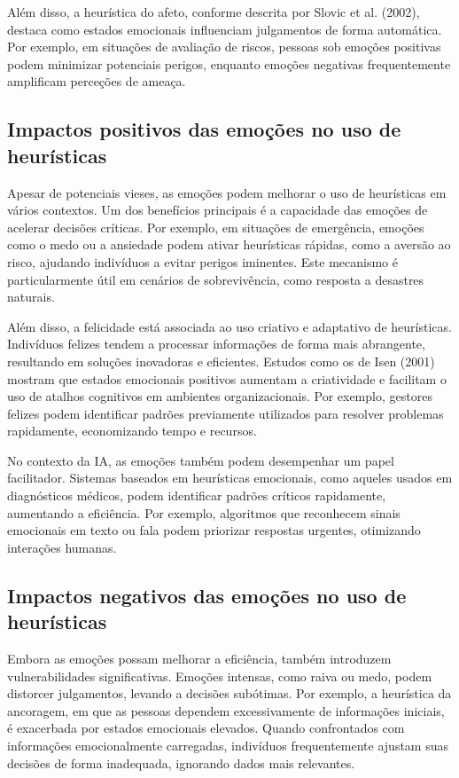 \documentclass[a4paper,12pt]{report}
\begin{document}
	Além disso, a heurística do afeto, conforme descrita por Slovic et al. (2002), destaca como estados emocionais influenciam julgamentos de forma automática. Por exemplo, em situações de avaliação de riscos, pessoas sob emoções positivas podem minimizar potenciais perigos, enquanto emoções negativas frequentemente amplificam perceções de ameaça.
	
	\subsection{Impactos positivos das emoções no uso de heurísticas}
	
	Apesar de potenciais vieses, as emoções podem melhorar o uso de heurísticas em vários contextos. Um dos benefícios principais é a capacidade das emoções de acelerar decisões críticas. Por exemplo, em situações de emergência, emoções como o medo ou a ansiedade podem ativar heurísticas rápidas, como a aversão ao risco, ajudando indivíduos a evitar perigos iminentes. Este mecanismo é particularmente útil em cenários de sobrevivência, como resposta a desastres naturais.
	
	Além disso, a felicidade está associada ao uso criativo e adaptativo de heurísticas. Indivíduos felizes tendem a processar informações de forma mais abrangente, resultando em soluções inovadoras e eficientes. Estudos como os de Isen (2001) mostram que estados emocionais positivos aumentam a criatividade e facilitam o uso de atalhos cognitivos em ambientes organizacionais. Por exemplo, gestores felizes podem identificar padrões previamente utilizados para resolver problemas rapidamente, economizando tempo e recursos.
	
	No contexto da IA, as emoções também podem desempenhar um papel facilitador. Sistemas baseados em heurísticas emocionais, como aqueles usados em diagnósticos médicos, podem identificar padrões críticos rapidamente, aumentando a eficiência. Por exemplo, algoritmos que reconhecem sinais emocionais em texto ou fala podem priorizar respostas urgentes, otimizando interações humanas.
	
	\subsection{Impactos negativos das emoções no uso de heurísticas}
	
	Embora as emoções possam melhorar a eficiência, também introduzem vulnerabilidades significativas. Emoções intensas, como raiva ou medo, podem distorcer julgamentos, levando a decisões subótimas. Por exemplo, a heurística da ancoragem, em que as pessoas dependem excessivamente de informações iniciais, é exacerbada por estados emocionais elevados. Quando confrontados com informações emocionalmente carregadas, indivíduos frequentemente ajustam suas decisões de forma inadequada, ignorando dados mais relevantes.
	
\end{document}

